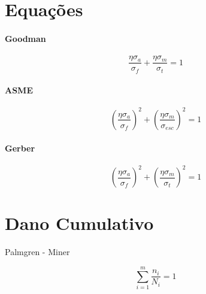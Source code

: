 \section{Equações}

\paragraph*{Goodman}
\begin{equation}
\frac{\eta \sigma _{a}}{\sigma _{f}}+\frac{\eta \sigma _{m}}{\sigma _{t}}=1
\end{equation}

\paragraph*{ASME}
\begin{equation}
\left( \frac{\eta \sigma _{a}}{\sigma _{f}} \right)^{2}+ \left(  \frac{\eta \sigma _{m}}{\sigma _{esc}} \right)^{2} = 1
\end{equation}


\paragraph*{Gerber}
\begin{equation}
\left( \frac{\eta \sigma _{a}}{\sigma _{f}} \right)^{2}+ \left(  \frac{\eta \sigma _{m}}{\sigma _{t}} \right)^{2} = 1
\end{equation}



\section{Dano Cumulativo}
Palmgren - Miner

\[\sum _{i=1}^{m} {\frac{n_{i}}{N_{i}}}=1\]


